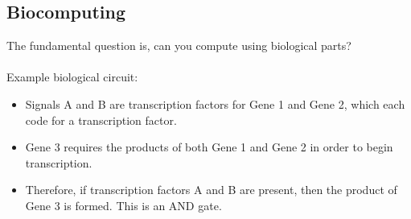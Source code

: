 \documentclass[10pt]{article}
\begin{document}
\subsection*{Biocomputing}
The fundamental question is, can you compute using biological parts?\\\\
Example biological circuit:
\begin{itemize}
	\item Signals A and B are transcription factors for Gene 1 and Gene 2, which each code for a transcription factor.  
    \item Gene 3 requires the products of both Gene 1 and Gene 2 in order to begin transcription.  
    \item Therefore, if transcription factors A and B are present, then the product of Gene 3 is formed.  This is an AND gate.
\end{itemize}
\end{document}
